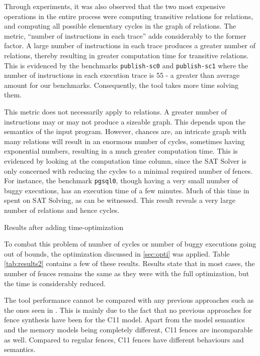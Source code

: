 Through experiments, it was also observed that the two most expensive 
operations in the entire process were computing transitive relations for \lhb
relations, and computing all possible elementary cycles in the graph of \lto
relations. The metric, ``number of instructions in each trace'' adds
considerably to the former factor. A large number of instructions in each
trace produces a greater number of \lhb relations, thereby resulting in
greater computation time for transitive relations. This is evidenced by the benchmarks
\texttt{publish-sc0} and \texttt{publish-sc1} where the number of instructions in each
execution trace is 55 - a greater than average amount for our benchmarks.
Consequently, the tool takes more time solving them.

This metric does not necessarily apply to \lto relations.
A greater number of instructions may or may not produce a sizeable \lto graph.
This depends upon the semantics of the input program. However, chances are,
an intricate graph with many \lto relations will result in an enormous number of cycles, 
sometimes having exponential numbers, resulting in a much greater
computation time. This is evidenced by looking at the \z computation 
time column, since the SAT Solver is only concerned with reducing the cycles
to a minimal required number of fences. For instance, the benchmark \texttt{pgsql0}, though having 
a very small number of buggy executions, has an execution time of a few minutes. Much
of this time in spent on SAT Solving, as can be witnessed. This result reveals 
a very large number of \lto relations and hence cycles.

\begin{table}
\begin{center}
	
	\caption{Results after adding time-optimization}
	\label{tab:results2}
\end{center}
\end{table}

To combat this problem of number of cycles or number of buggy executions going out of bounds,
the optimization discussed in \ref{sec:opti} was applied.
Table \ref{tab:results2} contains a few of these results. Results state that
in most cases, the number of fences remains the same as they were with the 
full optimization, but the time is considerably reduced.

The tool performance cannot be compared with any previous approaches such as
the ones seen in \cite{ref1, ref2, etc}. This is mainly due to the fact that
no previous approaches for fence synthesis have been for the C11 model. Apart
from the model semantics and the memory models being completely different,
C11 fences are incomparable as well. Compared to regular fences, C11 fences have
different behaviours and semantics.

